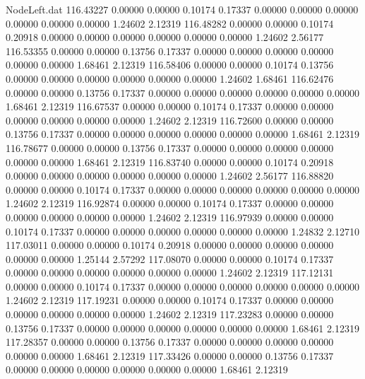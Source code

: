 \begin{filecontents}{NodeLeft.dat}
 116.43227    0.00000    0.00000     0.10174    0.17337    0.00000    0.00000    0.00000    0.00000    0.00000    0.00000    1.24602    2.12319
 116.48282    0.00000    0.00000     0.10174    0.20918    0.00000    0.00000    0.00000    0.00000    0.00000    0.00000    1.24602    2.56177
 116.53355    0.00000    0.00000     0.13756    0.17337    0.00000    0.00000    0.00000    0.00000    0.00000    0.00000    1.68461    2.12319
 116.58406    0.00000    0.00000     0.10174    0.13756    0.00000    0.00000    0.00000    0.00000    0.00000    0.00000    1.24602    1.68461
 116.62476    0.00000    0.00000     0.13756    0.17337    0.00000    0.00000    0.00000    0.00000    0.00000    0.00000    1.68461    2.12319
 116.67537    0.00000    0.00000     0.10174    0.17337    0.00000    0.00000    0.00000    0.00000    0.00000    0.00000    1.24602    2.12319
 116.72600    0.00000    0.00000     0.13756    0.17337    0.00000    0.00000    0.00000    0.00000    0.00000    0.00000    1.68461    2.12319
 116.78677    0.00000    0.00000     0.13756    0.17337    0.00000    0.00000    0.00000    0.00000    0.00000    0.00000    1.68461    2.12319
 116.83740    0.00000    0.00000     0.10174    0.20918    0.00000    0.00000    0.00000    0.00000    0.00000    0.00000    1.24602    2.56177
 116.88820    0.00000    0.00000     0.10174    0.17337    0.00000    0.00000    0.00000    0.00000    0.00000    0.00000    1.24602    2.12319
 116.92874    0.00000    0.00000     0.10174    0.17337    0.00000    0.00000    0.00000    0.00000    0.00000    0.00000    1.24602    2.12319
 116.97939    0.00000    0.00000     0.10174    0.17337    0.00000    0.00000    0.00000    0.00000    0.00000    0.00000    1.24832    2.12710
 117.03011    0.00000    0.00000     0.10174    0.20918    0.00000    0.00000    0.00000    0.00000    0.00000    0.00000    1.25144    2.57292
 117.08070    0.00000    0.00000     0.10174    0.17337    0.00000    0.00000    0.00000    0.00000    0.00000    0.00000    1.24602    2.12319
 117.12131    0.00000    0.00000     0.10174    0.17337    0.00000    0.00000    0.00000    0.00000    0.00000    0.00000    1.24602    2.12319
 117.19231    0.00000    0.00000     0.10174    0.17337    0.00000    0.00000    0.00000    0.00000    0.00000    0.00000    1.24602    2.12319
 117.23283    0.00000    0.00000     0.13756    0.17337    0.00000    0.00000    0.00000    0.00000    0.00000    0.00000    1.68461    2.12319
 117.28357    0.00000    0.00000     0.13756    0.17337    0.00000    0.00000    0.00000    0.00000    0.00000    0.00000    1.68461    2.12319
 117.33426    0.00000    0.00000     0.13756    0.17337    0.00000    0.00000    0.00000    0.00000    0.00000    0.00000    1.68461    2.12319

\end{filecontents}
